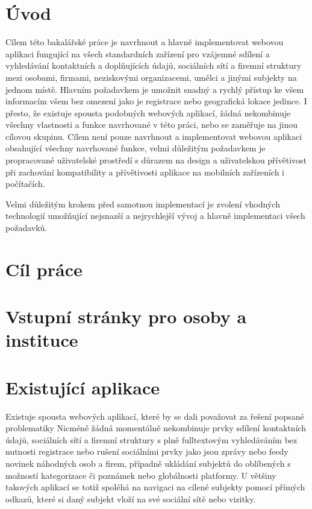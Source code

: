 \section{Úvod}


Cílem této bakalářské práce je navrhnout a hlavně implementovat webovou aplikaci fungující na všech standardních zařízení
pro vzájemné sdílení a vyhledávání kontaktních a doplňujících údajů, sociálních sítí a firemní struktury mezi osobami, firmami,
neziskovými organizacemi, umělci a jinými subjekty na jednom místě.
Hlavním požadavkem je umožnit snadný a rychlý přístup ke všem informacím všem bez omezení jako je registrace nebo
geografická lokace jedince.
I přesto, že existuje spousta podobných webových aplikací, žádná nekombinuje všechny vlastnosti a funkce navrhované
v této práci, nebo se zaměřuje na jinou cílovou skupinu.
Cílem není pouze navrhnout a implementovat webovou aplikaci obsahující všechny navrhované funkce, velmi důležitým
požadavkem je propracované uživatelské prostředí s důrazem na design a uživatelskou přívětivost při zachování kompatibility
a přívětivosti aplikace na mobilních zařízeních i počítačích.


Velmi důležitým krokem před samotnou implementací je zvolení vhodných technologií umožňující nejsnazší a nejrychlejší
vývoj a hlavně implementaci všech požadavků.

\section{Cíl práce}


\section{Vstupní stránky pro osoby a instituce}


\section{Existující aplikace}

Existuje spousta webových aplikací, které by se dali považovat za řešení popsané problematiky
Nicméně žádná momentálně nekombinuje prvky sdílení kontaktních údajů, sociálních sítí a firemní struktury s plně
fulltextovým vyhledáváním bez nutnosti registrace nebo rušení sociálními prvky jako jsou zprávy nebo feedy novinek
náhodných osob a firem, případně ukládání subjektů do oblíbených s možností kategorizace či poznámek nebo globálnosti
platformy.
U většiny takových aplikací se totiž spoléhá na navigaci na cílené subjekty pomocí přímých odkazů, které si daný subjekt
vloží na své sociální sítě nebo vizitky.

